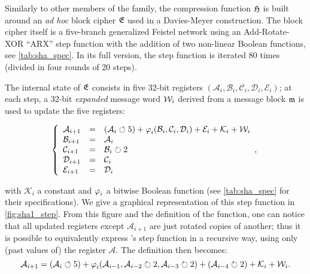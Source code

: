 Similarly to other members of the \mdsha family, the compression function $\operatorname{\mathfrak{H}}$ is built around an \emph{ad hoc} block cipher $\operatorname{\mathfrak{E}}$ used in a Davies-Meyer construction.
The block cipher itself is a five-branch generalized Feistel network using an Add-Rotate-XOR ``ARX'' step function with the addition of two non-linear Boolean functions, see \autoref{tab:sha_spec}.
In its full version, the step function is iterated 80 times (divided in four rounds of 20 steps).

The internal state of $\operatorname{\mathfrak{E}}$ consists in five 32-bit registers $(\mathcal{A}_i, \mathcal{B}_i, \mathcal{C}_i, \mathcal{D}_i, \mathcal{E}_i)$; at each step, a 32-bit \emph{expanded} message word $\mathcal{W}_i$ derived from
a message block $\mathfrak{m}$
is used to update the five registers:

\[
\left\{
\begin{array}{lcl}
\mathcal{A}_{i+1} & = & (\mathcal{A}_i \circlearrowleft 5) + \operatorname{\varphi}_i(\mathcal{B}_i,\mathcal{C}_i,\mathcal{D}_i) + \mathcal{E}_i + \mathcal{K}_i + \mathcal{W}_i\\
\mathcal{B}_{i+1} & = & \mathcal{A}_i\\
\mathcal{C}_{i+1} & = & \mathcal{B}_i \circlearrowright 2 \\
\mathcal{D}_{i+1} & = & \mathcal{C}_i \\
\mathcal{E}_{i+1} & = & \mathcal{D}_i \\
\end{array},
\right.	
\]

\noindent with $\mathcal{K}_i$ a constant and $\operatorname{\varphi}_i$ a bitwise Boolean function (see \autoref{tab:sha_spec} for their specifications).
We give a graphical representation of this step function in \autoref{fig:sha1_step}.
From this figure and the definition of the function, one can notice that all updated registers except $\mathcal{A}_{i+1}$ are just rotated copies of another;
thus it is possible to equivalently express \shaone's step function in a recursive way, using only (past values of) the register $\mathcal{A}$. The definition then becomes:
\begin{equation}
\label{eq:rec_step}
\mathcal{A}_{i+1} = (\mathcal{A}_i \circlearrowleft 5) + \operatorname{\varphi}_i(\mathcal{A}_{i-1},\mathcal{A}_{i-2}\circlearrowright 2,\mathcal{A}_{i-3}\circlearrowright 2) + (\mathcal{A}_{i-4}\circlearrowright 2) + \mathcal{K}_i + \mathcal{W}_i.
\end{equation}

